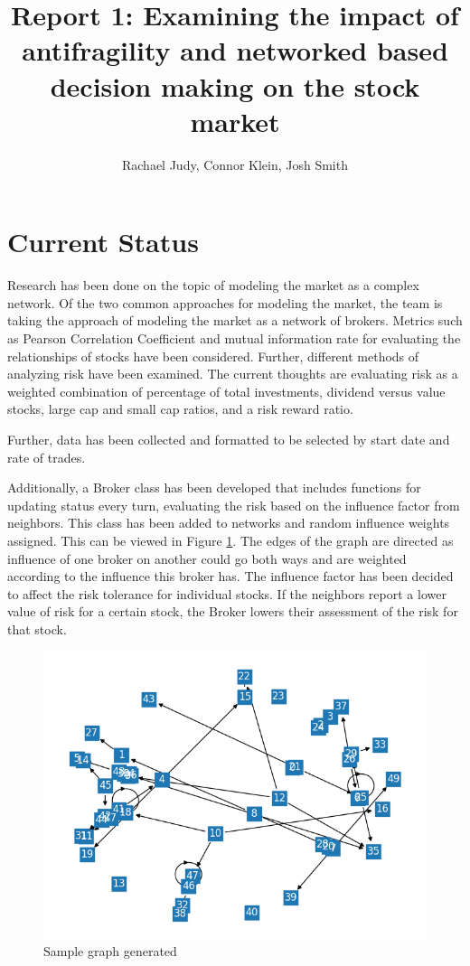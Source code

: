 \documentclass[letterpaper, 10 pt, proceedings]{ieeetran}  %
\title{\LARGE \bf
	Report 1: Examining the impact of antifragility and networked based decision making on the stock market
}
\author{Rachael Judy, Connor Klein, Josh Smith%
}
\begin{document}
	
	\maketitle
	\thispagestyle{empty}
	\pagestyle{empty}
	
	
	\section{Current Status}
	Research has been done on the topic of modeling the market as a complex network. Of the two common approaches for modeling the market, the team is taking the approach of modeling the market as a network of brokers. Metrics such as Pearson Correlation Coefficient and mutual information rate for evaluating the relationships of stocks have been considered. Further, different methods of analyzing risk have been examined. The current thoughts are evaluating risk as a weighted combination of percentage of total investments, dividend versus value stocks, large cap and small cap ratios, and a risk reward ratio. 
	
	
	Further, data has been collected and formatted to be selected by start date and rate of trades. 
	
	Additionally, a Broker class has been developed that includes functions for updating status every turn, evaluating the risk based on the influence factor from neighbors. This class has been added to networks and random influence weights assigned. This can be viewed in Figure \ref{samplegraph}. The edges of the graph are directed as influence of one broker on another could go both ways and are weighted according to the influence this broker has. The influence factor has been decided to affect the risk tolerance for individual stocks. If the neighbors report a lower value of risk for a certain stock, the Broker lowers their assessment of the risk for that stock.
	
	\begin{figure}
		\includegraphics[width=.5\textwidth]{samplegraph.png}
		\caption{Sample graph generated}
		\label{samplegraph}
	\end{figure}
	
\end{document}
